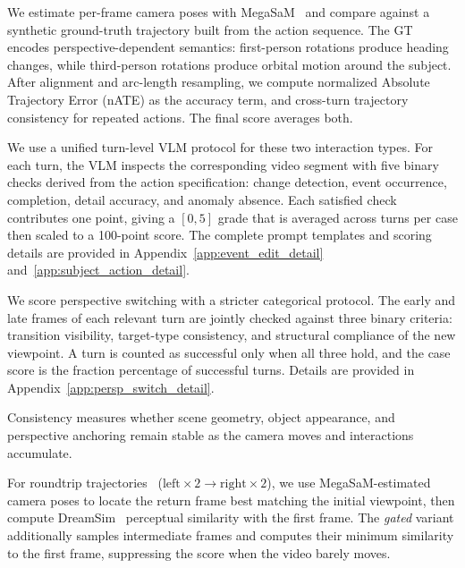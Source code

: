 We estimate per-frame camera poses with MegaSaM~\cite{li2024megasam} and compare against a synthetic ground-truth trajectory built from the action sequence.
The GT encodes perspective-dependent semantics: first-person rotations produce heading changes, while third-person rotations produce orbital motion around the subject.
After alignment and arc-length resampling, we compute normalized Absolute Trajectory Error (nATE) as the accuracy term, and cross-turn trajectory consistency for repeated actions. The final score averages both.

We use a unified turn-level VLM protocol for these two interaction types. For each turn, the VLM inspects the corresponding video segment with five binary checks derived from the action specification: change detection, event occurrence, completion, detail accuracy, and anomaly absence. Each satisfied check contributes one point, giving a $[0,5]$ grade that is averaged across turns per case then scaled to a 100-point score. The complete prompt templates and scoring details are provided in Appendix~\ref{app:event_edit_detail} and~\ref{app:subject_action_detail}.

We score perspective switching with a stricter categorical protocol. The early and late frames of each relevant turn are jointly checked against three binary criteria: transition visibility, target-type consistency, and structural compliance of the new viewpoint. A turn is counted as successful only when all three hold, and the case score is the fraction percentage of successful turns. Details are provided in Appendix~\ref{app:persp_switch_detail}.


Consistency measures whether scene geometry, object appearance, and perspective anchoring remain stable as the camera moves and interactions accumulate.

For roundtrip trajectories~\cite{ye2026mind} (\eg $\text{left}\!\times\!2 \rightarrow \text{right}\!\times\!2$), we use MegaSaM-estimated camera poses to locate the return frame best matching the initial viewpoint, then compute DreamSim~\cite{fu2023dreamsim} perceptual similarity with the first frame.
The \emph{gated} variant additionally samples intermediate frames and computes their minimum similarity to the first frame, suppressing the score when the video barely moves.

